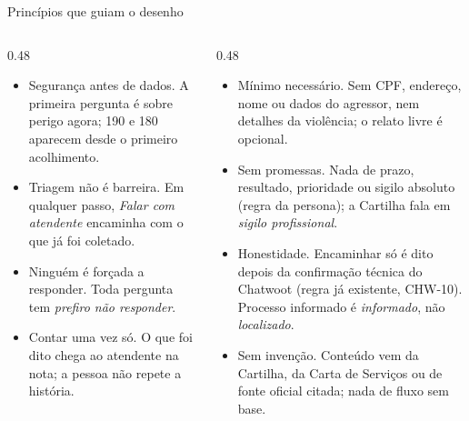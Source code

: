 \documentclass[aspectratio=169,10pt]{beamer}
\begin{document}
\begin{frame}{Princípios que guiam o desenho}
\begin{columns}[T]
\begin{column}{0.48\textwidth}
\begin{itemize}\setlength\itemsep{5pt}\small
  \item \alert{Segurança antes de dados.} A primeira pergunta é sobre perigo agora; 190 e 180 aparecem desde o primeiro acolhimento.
  \item \alert{Triagem não é barreira.} Em qualquer passo, \emph{Falar com atendente} encaminha com o que já foi coletado.
  \item \alert{Ninguém é forçada a responder.} Toda pergunta tem \emph{prefiro não responder}.
  \item \alert{Contar uma vez só.} O que foi dito chega ao atendente na nota; a pessoa não repete a história.
\end{itemize}
\end{column}
\begin{column}{0.48\textwidth}
\begin{itemize}\setlength\itemsep{5pt}\small
  \item \alert{Mínimo necessário.} Sem CPF, endereço, nome ou dados do agressor, nem detalhes da violência; o relato livre é opcional.
  \item \alert{Sem promessas.} Nada de prazo, resultado, prioridade ou sigilo absoluto (regra da persona); a Cartilha fala em \emph{sigilo profissional}.
  \item \alert{Honestidade.} Encaminhar só é dito depois da confirmação técnica do Chatwoot (regra já existente, CHW-10). Processo informado é \emph{informado}, não \emph{localizado}.
  \item \alert{Sem invenção.} Conteúdo vem da Cartilha, da Carta de Serviços ou de fonte oficial citada; nada de fluxo sem base.
\end{itemize}
\end{column}
\end{columns}
\end{frame}
\end{document}
